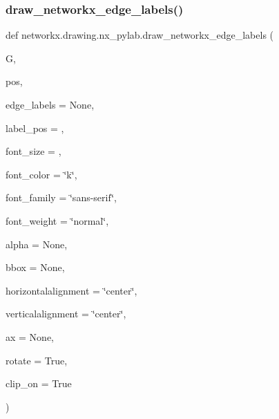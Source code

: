  \mbox{\label{namespacenetworkx_1_1drawing_1_1nx__pylab_ac71727a8ce6993138e6b4e9b2b38ec6c}} 
\subsubsection{\texorpdfstring{draw\+\_\+networkx\+\_\+edge\+\_\+labels()}{draw\_networkx\_edge\_labels()}}
{\footnotesize\ttfamily def networkx.\+drawing.\+nx\+\_\+pylab.\+draw\+\_\+networkx\+\_\+edge\+\_\+labels (\begin{DoxyParamCaption}\item[{}]{G,  }\item[{}]{pos,  }\item[{}]{edge\+\_\+labels = {\ttfamily None},  }\item[{}]{label\+\_\+pos = {},  }\item[{}]{font\+\_\+size = {},  }\item[{}]{font\+\_\+color = {\ttfamily \char`\"{}k\char`\"{}},  }\item[{}]{font\+\_\+family = {\ttfamily \char`\"{}sans-\/serif\char`\"{}},  }\item[{}]{font\+\_\+weight = {\ttfamily \char`\"{}normal\char`\"{}},  }\item[{}]{alpha = {\ttfamily None},  }\item[{}]{bbox = {\ttfamily None},  }\item[{}]{horizontalalignment = {\ttfamily \char`\"{}center\char`\"{}},  }\item[{}]{verticalalignment = {\ttfamily \char`\"{}center\char`\"{}},  }\item[{}]{ax = {\ttfamily None},  }\item[{}]{rotate = {\ttfamily True},  }\item[{}]{clip\+\_\+on = {\ttfamily True} }\end{DoxyParamCaption})}

